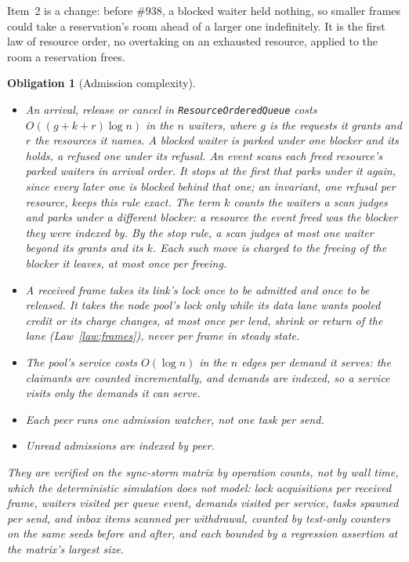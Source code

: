 \documentclass[journal]{IEEEtran}
\newtheorem{obligation}{Obligation}
\newcommand{\issue}[1]{\#{#1}}
\begin{document}
Item~2 is a change: before \issue{938}, a blocked waiter held nothing, so smaller frames could
take a reservation's room ahead of a larger one indefinitely.  It is the first law of resource
order, no overtaking on an exhausted resource, applied to the room a reservation frees.

\begin{obligation}[Admission complexity]\label{ob:complexity}
\begin{itemize}[leftmargin=1.2em]
\item An arrival, release or cancel in \texttt{ResourceOrderedQueue} costs
$O((g+k+r)\log n)$ in the $n$ waiters, where $g$ is the requests it grants and $r$ the
resources it names.  A blocked waiter is parked under one blocker and its holds, a refused one
under its refusal.  An event scans each freed resource's parked waiters in arrival order.  It
stops at the first that parks under it again, since every later one is blocked behind that one;
an invariant, one refusal per resource, keeps this rule exact.  The term $k$ counts the waiters
a scan judges and parks under a different blocker: a resource the event freed was the blocker
they were indexed by.  By the stop rule, a scan judges at most one waiter beyond its grants and
its $k$.  Each such move is charged to the freeing of the blocker it leaves, at most once per
freeing.
\item A received frame takes its link's lock once to be admitted and once to be released.  It
takes the node pool's lock only while its data lane wants pooled credit or its charge changes,
at most once per lend, shrink or return of the lane (Law~\ref{law:frames}), never per frame
in steady state.
\item The pool's service costs $O(\log n)$ in the $n$ edges per demand it serves: the
claimants are counted incrementally, and demands are indexed, so a service visits only the
demands it can serve.
\item Each peer runs one admission watcher, not one task per send.
\item Unread admissions are indexed by peer.
\end{itemize}
They are verified on the sync-storm matrix by operation counts, not by wall time, which the
deterministic simulation does not model: lock acquisitions per received frame, waiters visited
per queue event, demands visited per service, tasks spawned per send, and inbox items scanned
per withdrawal, counted by test-only counters on the same seeds before and after, and each
bounded by a regression assertion at the matrix's largest size.
\end{obligation}
\end{document}
